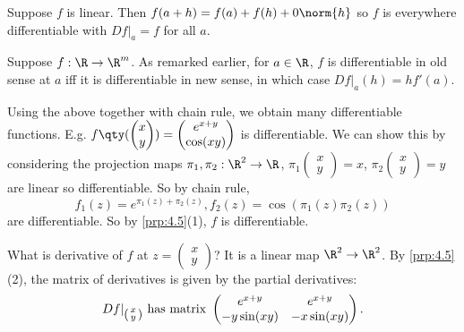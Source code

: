 \begin{example}
    Suppose $f$ is linear. Then $f(a+h) = f(a) + f(h) + 0\norm{h}$ so $f$ is everywhere differentiable with $Df|_a = f$ for all $a$.
\end{example} 

\begin{example}
    Suppose $f: \R \to\R^m$. As remarked earlier, for $a\in \R$, $f$ is differentiable in old sense at $a$ iff it is differentiable in new sense, in which case $Df|_a(h) = hf'(a)$.
\end{example} 

\begin{example}
Using the above together with chain rule, we obtain many differentiable functions. E.g. $f \qty(\begin{pmatrix} x\\ y \end{pmatrix}) = \begin{pmatrix} e^{x+y}\\ \cos(xy) \end{pmatrix}$ is differentiable. We can show this by considering the projection maps $\pi_1, \pi_2: \R^2\to \R$, $\pi_1\begin{pmatrix} x\\ y \end{pmatrix} = x$, $\pi_2 \begin{pmatrix} x\\ y \end{pmatrix} = y$ are linear so differentiable. So by chain rule, \[f_1(z) = e^{\pi_1(z) + \pi_2(z)}, f_2(z) = \cos(\pi_1(z)\pi_2(z)) \] are differentiable. So by \cref{prp:4.5}(1), $f$ is differentiable.

What is derivative of $f$ at $z = \begin{pmatrix} x\\ y \end{pmatrix}$? It is a linear map $\R^2 \to \R^2$. By \cref{prp:4.5}(2), the matrix of derivatives is given by the partial derivatives: \[ Df|_{\begin{psmallmatrix} x\\ y \end{psmallmatrix}} \textup{ has matrix } \begin{pmatrix} e^{x+y} & e^{x+y}\\ -y\sin(xy) & -x\sin(xy) \end{pmatrix}. \]
\end{example}

